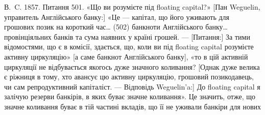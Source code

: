 В.~C. 1857. Питання 501. «Що ви розумієте під floating capital?» [Пан
Weguelin, управитель Англійського банку:] «Це — капітал, що його уживають
для грошових позик на короткий час\dots{} (502) банкноти Англійського банку\dots{}
провінціяльних банків та сума наявних у країні грошей. — [Питання:] За тими
відомостями, що є в комісії, здається, що, коли ви під floating capital розумієте
активну циркуляцію» [а саме банкнот Англійського банку], «то в цій активній
циркуляції не відбувається якогось дуже значного коливання? [Однак дуже велика
є ріжниця в тому, хто авансує цю активну циркуляцію, грошовий позикодавець,
чи сам репродуктивний капіталіст. — Відповідь Weguelin’a:] До floating capital я
залічую резерви банкірів, в яких буває значне коливання». Це значить, отже, що
значне коливання буває в тій частині вкладів, що її не уживали банкіри для нових
\parbreak{}  %
